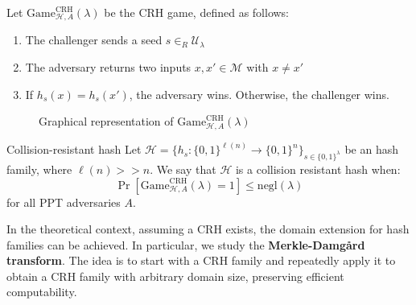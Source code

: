 \documentclass[a4paper, 12pt]{report}
\begin{document}
    Let $\mathrm{Game}_{\mathcal{H}, A}^{\text{CRH}}(\lambda)$ be the CRH game, defined as follows:
    \begin{enumerate}
        \item The challenger sends a seed $s \in_R \mathcal{U}_\lambda$
        \item The adversary returns two inputs $x,x' \in \mathcal{M}$ with $x \neq x'$
        \item If $h_s(x) = h_s(x')$, the adversary wins. Otherwise, the challenger wins.
    \end{enumerate}
    
    \begin{figure}[H]
        \centering


        \caption{Graphical representation of $\mathrm{Game}^{\text{CRH}}_{\mathcal{H}, A}(\lambda)$}
    \end{figure}

    \begin{frameddefn}{Collision-resistant hash}
        Let $\mathcal{H} = \{h_s : \{0,1\}^{\ell(n)} \to \{0,1\}^n\}_{s \in \{0,1\}^\lambda}$ be an hash family, where $\ell(n) >> n$. We say that $\mathcal{H}$ is a collision resistant hash when:
        \[\Pr[\mathrm{Game}^{\text{CRH}}_{\mathcal{H}, A}(\lambda) = 1] \leq \mathrm{negl}(\lambda)\]
        for all PPT adversaries $A$.
    \end{frameddefn}

    In the theoretical context, assuming a CRH exists, the domain extension for hash families can be achieved. In particular, we study the \textbf{Merkle-Damg\aa rd transform}. The idea is to start with a CRH family and repeatedly apply it to obtain a CRH family with arbitrary domain size, preserving efficient computability.
\end{document}
